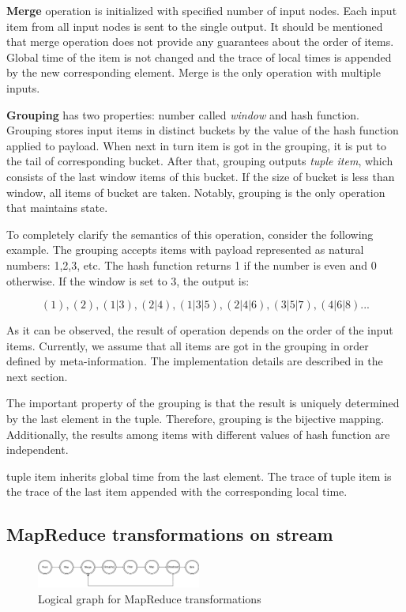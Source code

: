 {\bf Merge} operation is initialized with specified number of input nodes. Each input item from all input nodes is sent to the single output. It should be mentioned that merge operation does not provide any guarantees about the order of items. Global time of the item is not changed and the trace of local times is appended by the new corresponding element. Merge is the only operation with multiple inputs.

{\bf Grouping} has two properties: number called {\it window} and hash function. Grouping stores input items in distinct buckets by the value of the hash function applied to payload. When next in turn item is got in the grouping, it is put to the tail of corresponding bucket. After that, grouping outputs {\it tuple item}, which consists of the last window items of this bucket. If the size of bucket is less than window, all items of bucket are taken. Notably, grouping is the only operation that maintains state.
	
To completely clarify the semantics of this operation, consider the following example. The grouping accepts items with payload represented as natural numbers: 1,2,3, etc. The hash function returns 1 if the number is even and 0 otherwise. If the window is set to 3, the output is:

\[(1), (2), (1|3), (2|4), (1|3|5), (2|4|6), (3|5|7), (4|6|8)...\]

As it can be observed, the result of operation depends on the order of the input items. Currently, we assume that all items are got in the grouping in order defined by meta-information. The implementation details are described in the next section. 

The important property of the grouping is that the result is uniquely determined by the last element in the tuple. Therefore, grouping is the bijective mapping. Additionally, the results among items with different values of hash function are independent.

tuple item inherits global time from the last element. The trace of tuple item is the trace of the last item appended with the corresponding local time.  

\subsection{MapReduce transformations on stream}

\begin{figure}[htbp]
  \centering
  \includegraphics[width=0.48\textwidth]{pics/mapreduce}
  \caption{Logical graph for MapReduce transformations}
  \label {logical-graph-figure}
\end{figure}

